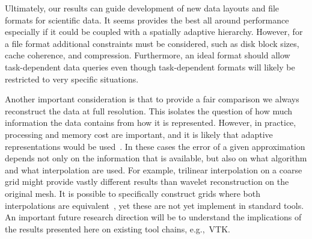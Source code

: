 Ultimately, our results can guide development of new data layouts and file formats for scientific
data. It seems \swav provides the best all around performance especially if it could be coupled with
a spatially adaptive hierarchy. However, for a file format additional constraints must be
considered, such as disk block sizes, cache coherence, and compression. Furthermore, an ideal format
should allow task-dependent data queries even though task-dependent formats will likely be
restricted to very specific situations. 

Another important consideration is that to provide a fair comparison we always reconstruct the data
at full resolution. This isolates the question of how much information the data contains from how it
is represented. However, in practice, processing and memory cost are important, and it is likely
that adaptive representations would be used~\cite{gigavoxels,Gobbetti2008,vdb2013}. In these cases
the error of a given approximation depends not only on the information that is available, but also
on what algorithm and what interpolation are used. For example, trilinear interpolation on a coarse
grid might provide vastly different results than wavelet reconstruction on the original mesh. It is
possible to specifically construct grids where both interpolations are equivalent~\cite{weiss}, yet
these are not yet implement in standard tools. An important future research direction will be to
understand the implications of the results presented here on existing tool chains, e.g.,\ VTK.

